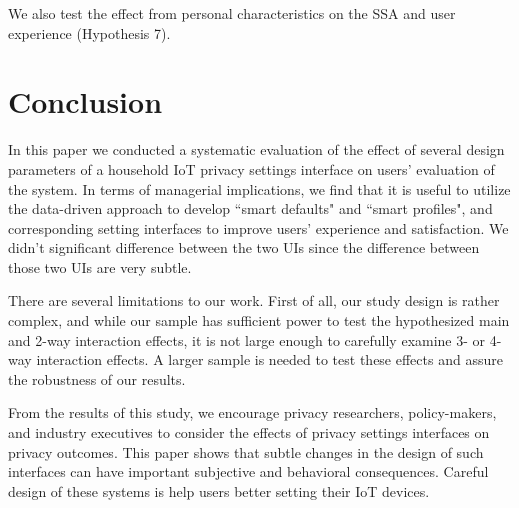 We also test the effect from personal characteristics on the SSA and user experience (Hypothesis 7).

\section{Conclusion}
In this paper we conducted a systematic evaluation of the effect of several design parameters of a household IoT privacy settings interface on users’ evaluation of the system. In terms of managerial implications, we find that it is useful to utilize the data-driven approach to develop ``smart defaults" and ``smart profiles", and corresponding setting interfaces to improve users' experience and satisfaction. We didn't significant difference between the two UIs since the difference between those two UIs are very subtle.

There are several limitations to our work. First of all, our study design is rather complex, and while our sample has sufficient power to test the hypothesized main and 2-way interaction effects, it is not large enough to carefully examine 3- or 4-way interaction effects. A larger sample is needed to test these effects and assure the robustness of our results.

From the results of this study, we encourage privacy researchers, policy-makers, and industry executives to consider the effects of privacy settings interfaces on privacy outcomes. This paper shows that subtle changes in the design of such interfaces can have important subjective and behavioral consequences. Careful design of these systems is help users better setting their IoT devices.
